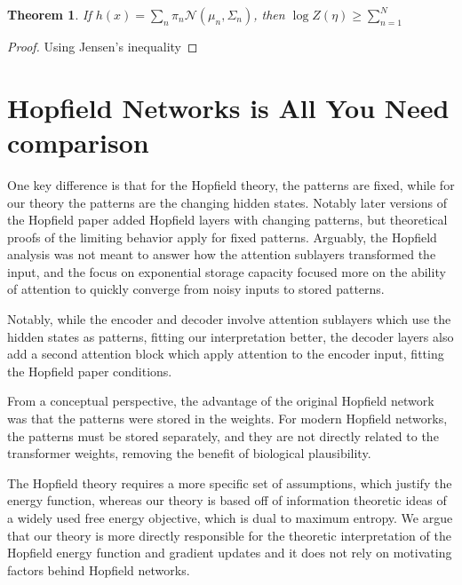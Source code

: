\documentclass{article}
\newtheorem{theorem}{Theorem}
\begin{document}
\begin{theorem}
  If $h(x) = \sum_n \pi_n \mathcal{N} \left( \mu_n, \Sigma_n \right)$, then $\log Z(\eta) \geq \sum_{n=1}^N $
  \label{}
\end{theorem}

\begin{proof}
  Using Jensen's inequality
\end{proof}

\section{Hopfield Networks is All You Need comparison}
\label{hniayn}

One key difference is that for the Hopfield theory, the patterns are fixed, while for our theory the patterns are the changing hidden states. Notably later versions of the Hopfield paper added Hopfield layers with changing patterns, but theoretical proofs of the limiting behavior apply for fixed patterns. Arguably, the Hopfield analysis was not meant to answer how the attention sublayers transformed the input, and the focus on exponential storage capacity focused more on the ability of attention to quickly converge from noisy inputs to stored patterns.

Notably, while the encoder and decoder involve attention sublayers which use the hidden states as patterns, fitting our interpretation better, the decoder layers also add a second attention block which apply attention to the encoder input, fitting the Hopfield paper conditions.

From a conceptual perspective, the advantage of the original Hopfield network was that the patterns were stored in the weights. For modern Hopfield networks, the patterns must be stored separately, and they are not directly related to the transformer weights, removing the benefit of biological plausibility. 

The Hopfield theory requires a more specific set of assumptions, which justify the energy function, whereas our theory is based off of information theoretic ideas of a widely used free energy objective, which is dual to maximum entropy. We argue that our theory is more directly responsible for the theoretic interpretation of the Hopfield energy function and gradient updates and it does not rely on motivating factors behind Hopfield networks.
\end{document}
